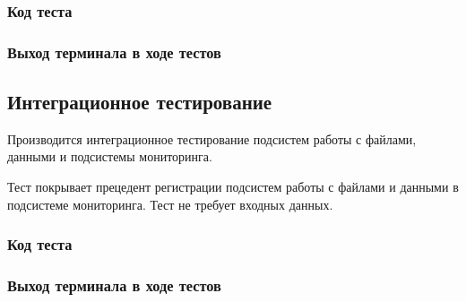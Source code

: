 \documentclass[a4paper,12pt]{report}
\numberwithin{equation}{section}
\begin{document}
\subsubsection{Код теста}


\subsubsection{Выход терминала в ходе тестов}



\subsection{Интеграционное тестирование}
Производится интеграционное тестирование подсистем работы с файлами, данными и подсистемы мониторинга.


Тест покрывает прецедент регистрации подсистем работы с файлами и данными в подсистеме мониторинга.
Тест не требует входных данных.


\subsubsection{Код теста}


\subsubsection{Выход терминала в ходе тестов}

\end{document}
